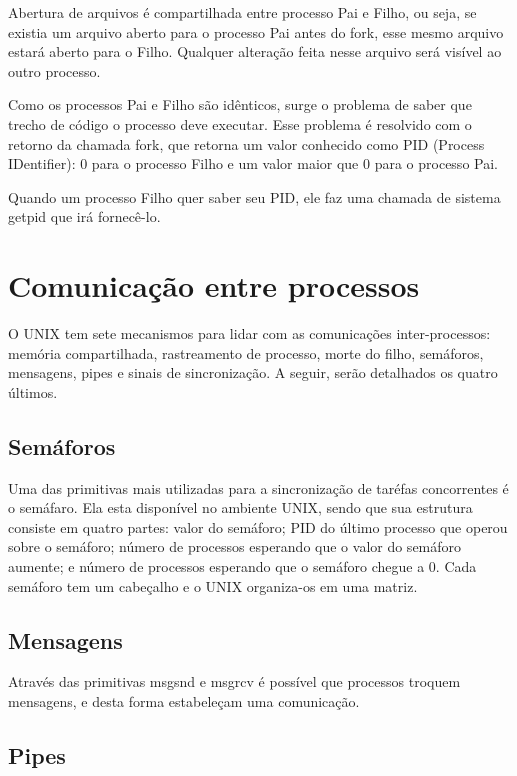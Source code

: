 Abertura de arquivos é compartilhada entre processo Pai e Filho, ou seja, se existia um arquivo aberto para o processo Pai antes do fork, esse mesmo arquivo estará aberto para o Filho. Qualquer alteração feita nesse arquivo será visível ao outro processo.

Como os processos Pai e Filho são idênticos, surge o problema de saber que trecho de código o processo deve executar. Esse problema é resolvido com o retorno da chamada fork, que retorna um valor conhecido como PID (Process IDentifier): 0 para o processo Filho e um valor maior que 0 para o processo Pai.

Quando um processo Filho quer saber seu PID, ele faz uma chamada de sistema getpid que irá fornecê-lo.

\section{Comunicação entre processos}

O UNIX tem sete mecanismos para lidar com as comunicações inter-processos: memória compartilhada, rastreamento de processo, morte do filho, semáforos, mensagens, pipes e sinais de sincronização. A seguir, serão detalhados os quatro últimos.

\subsection{Semáforos}

Uma das primitivas mais utilizadas para a sincronização de taréfas concorrentes é o semáfaro. Ela esta disponível no ambiente UNIX, sendo que sua estrutura consiste em quatro partes: valor do semáforo; PID do último processo que operou sobre o semáforo; número de processos esperando que o valor do semáforo aumente; e número de processos esperando que o semáforo chegue a 0. Cada semáforo tem um cabeçalho e o UNIX organiza-os em uma matriz.

\subsection{Mensagens}

Através das primitivas msgsnd e msgrcv é possível que processos troquem mensagens, e desta forma estabeleçam uma comunicação.

\subsection{Pipes}

